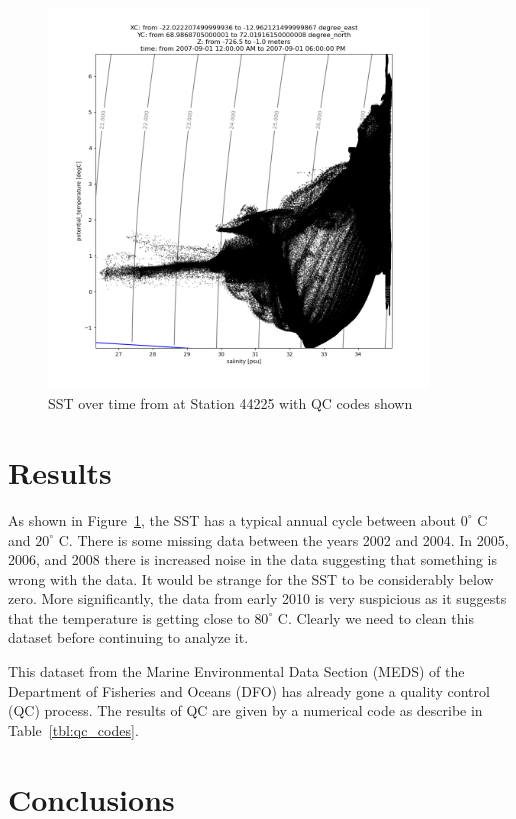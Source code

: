 \documentclass[12pt, letterpaper]{article}
\begin{document}
\begin{figure}
\includegraphics[width=0.9\textwidth]{TempvsSalinity}
\caption{SST over time from at Station 44225 with QC codes shown}
\label{fig:TempvsSalinity}
\end{figure}



\section{Results}

As shown in Figure~\ref{fig:TempvsSalinity}, the SST has a typical annual cycle between about $0^\circ$ C and $20^\circ$ C. There is some missing data between the years 2002 and 2004.  In 2005, 2006, and 2008 there is
increased noise in the data suggesting that something is wrong with the data.  It would be strange for the SST to be considerably below zero.  More significantly, the data from early 2010 is very suspicious as it suggests that the temperature is getting close to $80^\circ$ C.  Clearly we need to clean this dataset before continuing to analyze it.



This dataset from the Marine Environmental Data Section (MEDS) of the Department of Fisheries and Oceans (DFO) has already gone a quality control (QC) process. The results of QC are given by a numerical code as describe in Table~\ref{tbl:qc_codes}.








\section{Conclusions}


\end{document}
